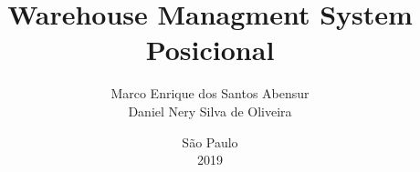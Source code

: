 \documentclass[12pt,openright,oneside,a4paper,brazilian]{abntex2}
\title{Warehouse Managment System Posicional}
\author{Marco Enrique dos Santos Abensur\\
		Daniel Nery Silva de Oliveira}
\date{São Paulo\\2019}
\begin{document}
\imprimircapa
\imprimirfalsafolhaderosto
\imprimirfolhaderosto




\tableofcontents







\end{document}
